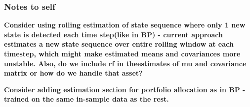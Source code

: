 \subsubsection{Notes to self}


\textbf{Consider using rolling estimation of state sequence where only 1 new state is detected each time step(like in BP) - current approach estimates a new state sequence over entire rolling window at each timestep, which might make estimated means and covariances more unstable. Also, do we include rf in theestimates of mu and covariance matrix or how do we handle that asset?}

\textbf{Consider adding estimation section for portfolio allocation as in BP - trained on the same in-sample data as the rest.}